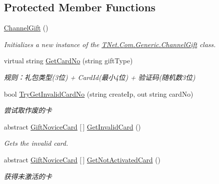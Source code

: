 \subsection*{Protected Member Functions}
\begin{DoxyCompactItemize}
\item 
\mbox{\hyperlink{class_t_net_1_1_com_1_1_generic_1_1_channel_gift_ad4511c1cff4205db5b89d6796271db14}{Channel\+Gift}} ()
\begin{DoxyCompactList}\small\item\em Initializes a new instance of the \mbox{\hyperlink{class_t_net_1_1_com_1_1_generic_1_1_channel_gift}{T\+Net.\+Com.\+Generic.\+Channel\+Gift}} class. \end{DoxyCompactList}\item 
virtual string \mbox{\hyperlink{class_t_net_1_1_com_1_1_generic_1_1_channel_gift_af52f559f17bd650695eb536927807b53}{Get\+Card\+No}} (string gift\+Type)
\begin{DoxyCompactList}\small\item\em 规则：礼包类型(3位) + Card\+Id(最小4位) + 验证码(随机数3位) \end{DoxyCompactList}\item 
bool \mbox{\hyperlink{class_t_net_1_1_com_1_1_generic_1_1_channel_gift_a922c54cd3d9e614e8ae3c97f752dc93f}{Try\+Get\+Invalid\+Card\+No}} (string create\+Ip, out string card\+No)
\begin{DoxyCompactList}\small\item\em 尝试取作废的卡 \end{DoxyCompactList}\item 
abstract \mbox{\hyperlink{class_t_net_1_1_com_1_1_model_1_1_gift_novice_card}{Gift\+Novice\+Card}} \mbox{[}$\,$\mbox{]} \mbox{\hyperlink{class_t_net_1_1_com_1_1_generic_1_1_channel_gift_a0c72dd14fb3b26d0a759b9f459fd8190}{Get\+Invalid\+Card}} ()
\begin{DoxyCompactList}\small\item\em Gets the invalid card. \end{DoxyCompactList}\item 
abstract \mbox{\hyperlink{class_t_net_1_1_com_1_1_model_1_1_gift_novice_card}{Gift\+Novice\+Card}} \mbox{[}$\,$\mbox{]} \mbox{\hyperlink{class_t_net_1_1_com_1_1_generic_1_1_channel_gift_a5120dcae903f683e53fef1c1c2017fd7}{Get\+Not\+Activated\+Card}} ()
\begin{DoxyCompactList}\small\item\em 获得未激活的卡 \end{DoxyCompactList}\item 

\end{DoxyCompactItemize}
